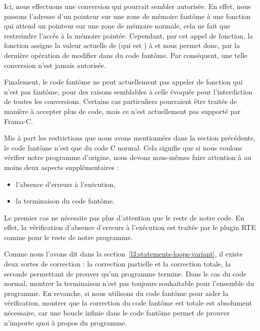 

Ici, nous effectuons une conversion qui pourrait sembler autorisée. En effet, nous
passons l'adresse d'un pointeur sur une zone de mémoire fantôme à une fonction qui
attend un pointeur sur une zone de mémoire normale, cela ne fait que restreindre
l'accès à la mémoire pointée. Cependant, par cet appel de fonction, la fonction
 assigne la valeur actuelle de  (qui est
) à  et nous permet donc, par la dernière opération
de modifier  dans du code fantôme. Par conséquent, une telle
conversion n'est jamais autorisée.


Finalement, le code fantôme ne peut actuellement pas appeler de fonction qui
n'est pas fantôme, pour des raisons semblables à celle évoquée pour
l'interdiction de toutes les conversions. Certains cas particuliers pourraient
être traités de manière à accepter plus de code, mais ce n'est actuellement pas
supporté par Frama-C.


\label{l3:acsl-logic-definitions-what-remains}


Mis à part les restrictions que nous avons mentionnées dans la section précédente,
le code fantôme n'est que du code C normal. Cela signifie que si nous voulons
vérifier notre programme d'origine, nous devons nous-mêmes faire attention à au
moins deux aspects supplémentaires :
\begin{itemize}
\item l'absence d'erreurs à l'exécution,
\item la terminaison du code fantôme.
\end{itemize}


Le premier cas ne nécessite pas plus d'attention que le reste de notre code.
En effet, la vérification d'absence d'erreurs à l'exécution est traitée par
le plugin RTE comme pour le reste de notre programme.


Comme nous l'avons dit dans la section~\ref{l3:statements-loops-variant}, il
existe deux sortes de correction : la correction partielle et la correction totale,
la seconde permettant de prouver qu'un programme termine. Dans le cas du code
normal, montrer la terminaison n'est pas toujours souhaitable pour l'ensemble
du programme. En revanche, si nous utilisons du code fantôme pour aider la
vérification, montrer que la correction du code fantôme est totale est
absolument nécessaire, car une boucle infinie dans le code fantôme permet de
prouver n'importe quoi à propos du programme.


